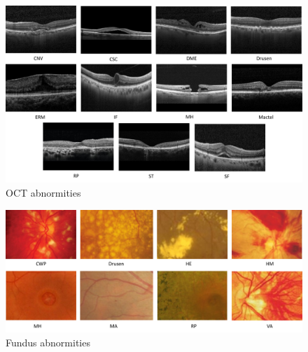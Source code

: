 \documentclass{article}
\begin{document}
	\begin{figure}[htbp]
		\centering
		\includegraphics[width=\linewidth]{Figs/OCT_Abnormities.pdf}
		\caption{OCT abnormities \autocite{Duker_Waheed_Goldman_2022}}
		\vspace{0.3cm}
		\label{fig:OCT_abnormities}
	\end{figure}
	
	\begin{figure}[htbp]
		\centering
		\includegraphics[width=\linewidth]{Figs/fundus_Abnormities.pdf}
		\caption{Fundus abnormities \autocite{Wolf_Kirchhof_Reim_2006}}
		\vspace{0.3cm}
		\label{fig:fundus_abnormities}
	\end{figure}
	
\end{document}
